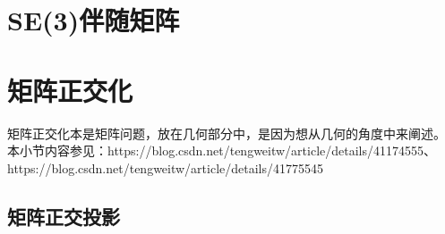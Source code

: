\section{SE(3)伴随矩阵}




\section{矩阵正交化}
矩阵正交化本是矩阵问题，放在几何部分中，是因为想从几何的角度中来阐述。\\
本小节内容参见：https://blog.csdn.net/tengweitw/article/details/41174555、\\
https://blog.csdn.net/tengweitw/article/details/41775545\\

\subsection*{矩阵正交投影}

